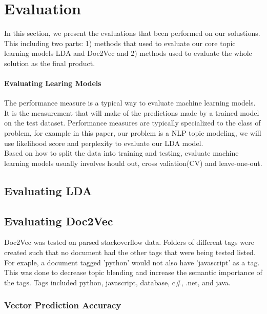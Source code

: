 
\section{Evaluation}
In this section, we present the evaluations that been performed on our solustions. This including two parts: 1) methods that used to evaluate our core topic learning models LDA and Doc2Vec and 2) methods used to evaluate the whole solution as the final product. 
\paragraph{Evaluating Learing Models}
The performance measure is a typical way to evaluate machine learning models. It is the measurement that will make of the predictions made by a trained model on the test dataset. Performance measures are typically specialized to the class of problem, for example in this paper, our problem is a NLP topic modeling, we will use likelihood score and perplexity to evaluate our LDA model.\\
Based on how to split the data into training and testing, evaluate machine learning models usually involves hould out, cross valiation(CV) and leave-one-out. 
\subsection{Evaluating LDA}


\subsection{Evaluating Doc2Vec}
Doc2Vec was tested on parsed stackoverflow data. Folders of different tags were created such that no document had the other tags that were being tested listed. For exaple, a document tagged 'python' would not also have 'javascript' as a tag. This was done to decrease topic blending and increase the semantic importance of the tags. Tags included python, javascript, database, c\#, .net, and java. 

\subsubsection{Vector Prediction Accuracy}
%
%
%
%

